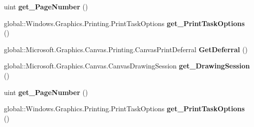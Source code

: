 \begin{DoxyCompactItemize}
\mbox{\label{interface_microsoft_1_1_graphics_1_1_canvas_1_1_printing_1_1_i_canvas_preview_event_args_a3a70ed88006f13b80460bcacd2b53cc4}} 
uint {\bfseries get\+\_\+\+Page\+Number} ()
\item 
\mbox{\label{interface_microsoft_1_1_graphics_1_1_canvas_1_1_printing_1_1_i_canvas_preview_event_args_a90316527a368a9c28b4a5f6c48a79ff5}} 
global\+::\+Windows.\+Graphics.\+Printing.\+Print\+Task\+Options {\bfseries get\+\_\+\+Print\+Task\+Options} ()
\item 
\mbox{\label{interface_microsoft_1_1_graphics_1_1_canvas_1_1_printing_1_1_i_canvas_preview_event_args_ac14e8353363cc191ad46607fb56c0566}} 
global\+::\+Microsoft.\+Graphics.\+Canvas.\+Printing.\+Canvas\+Print\+Deferral {\bfseries Get\+Deferral} ()
\item 
\mbox{\label{interface_microsoft_1_1_graphics_1_1_canvas_1_1_printing_1_1_i_canvas_preview_event_args_a3986afef79f94250c88e589b3a6c7bf8}} 
global\+::\+Microsoft.\+Graphics.\+Canvas.\+Canvas\+Drawing\+Session {\bfseries get\+\_\+\+Drawing\+Session} ()
\item 
\mbox{\label{interface_microsoft_1_1_graphics_1_1_canvas_1_1_printing_1_1_i_canvas_preview_event_args_a3a70ed88006f13b80460bcacd2b53cc4}} 
uint {\bfseries get\+\_\+\+Page\+Number} ()
\item 
\mbox{\label{interface_microsoft_1_1_graphics_1_1_canvas_1_1_printing_1_1_i_canvas_preview_event_args_a90316527a368a9c28b4a5f6c48a79ff5}} 
global\+::\+Windows.\+Graphics.\+Printing.\+Print\+Task\+Options {\bfseries get\+\_\+\+Print\+Task\+Options} ()
\item 
\mbox{\label{interface_microsoft_1_1_graphics_1_1_canvas_1_1_printing_1_1_i_canvas_preview_event_args_ac14e8353363cc191ad46607fb56c0566}} 

\end{DoxyCompactItemize}
